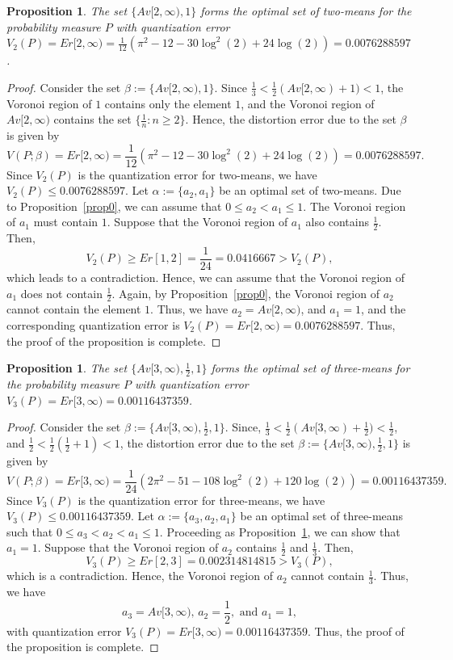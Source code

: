\documentclass[12pt, reqno]{amsart}
\theoremstyle{plain}
\newtheorem{prop}[subsection]{Proposition}
\theoremstyle{definition}
\newcommand{\set}[1]{\{#1\}}%
\newcommand{\ga}{\alpha}
\newcommand{\gb}{\beta}
\newcommand{\te}{\text}%
\begin{document}
\begin{prop} \label{prop01}
The set $\set{Av[2, \infty), 1}$ forms the optimal set of two-means for the probability measure $P$ with quantization error $V_2(P)=Er[2, \infty)=\frac{1}{12} \left(\pi ^2-12-30 \log ^2(2)+24 \log (2)\right)=0.0076288597$.
\end{prop}
\begin{proof}
Consider the set $\gb:=\set{Av[2, \infty), 1}$. Since $\frac 13<\frac 12 (Av[2, \infty)+1)<1$, the Voronoi region of $1$ contains only the element $1$, and the Voronoi region of $Av[2, \infty)$ contains the set $\set{\frac 1 n : n\geq 2}$. Hence, the distortion error due to the set $\gb$ is given by
\[V(P; \gb)=Er[2, \infty)=\frac{1}{12} \left(\pi ^2-12-30 \log ^2(2)+24 \log (2)\right)=0.0076288597.\]
Since $V_2(P)$ is the quantization error for two-means, we have $V_2(P)\leq 0.0076288597$. Let $\ga:=\set{a_2, a_1}$ be an optimal set of two-means. Due to Proposition~\ref{prop0}, we can assume that $0\leq a_2<a_1\leq 1$. The Voronoi region of $a_1$ must contain $1$. Suppose that the Voronoi region of $a_1$ also contains $\frac 12$. Then,
\[V_2(P)\geq Er[1,2]=\frac{1}{24}=0.0416667>V_2(P),\]
which leads to a contradiction. Hence, we can assume that the Voronoi region of $a_1$ does not contain $\frac 12$. Again, by Proposition~\ref{prop0}, the Voronoi region of $a_2$ cannot contain the element $1$. Thus, we have
$a_2=Av[2, \infty)$, and $a_1=1$, and the corresponding quantization error is $V_2(P)=Er[2, \infty)=0.0076288597$. Thus, the proof of the proposition is complete.
\end{proof}

\begin{prop} \label{prop02}
The set $\set{Av[3, \infty), \frac 12, 1}$ forms the optimal set of three-means for the probability measure $P$ with quantization error $V_3(P)=Er[3, \infty)=0.00116437359$.
\end{prop}
\begin{proof}
Consider the set $\gb:=\set{Av[3, \infty), \frac 12, 1}$. Since, $\frac 13 <\frac 12 (Av[3, \infty)+\frac 12)<\frac 12$, and $\frac 12<\frac 12(\frac 12+1)<1$, the distortion error due to the set $\gb:=\set{Av[3, \infty), \frac 12, 1}$ is given by
\[V(P; \gb)=Er[3, \infty)=\frac{1}{24} \left(2 \pi ^2-51-108 \log ^2(2)+120 \log (2)\right)=0.00116437359.\]
Since $V_3(P)$ is the quantization error for three-means, we have $V_3(P)\leq 0.00116437359$. Let $\ga:=\set{a_3, a_2, a_1}$ be an optimal set of three-means such that $0\leq a_3<a_2<a_1\leq 1$. Proceeding as Proposition~\ref{prop01}, we can show that $a_1=1$. Suppose that the Voronoi region of $a_2$  contains $\frac 12$ and $\frac 13$. Then,
  \[V_3(P)\geq Er[2,3]=0.002314814815>V_3(P),\]
which is a contradiction. Hence, the Voronoi region of $a_2$ cannot contain $\frac 13$. Thus, we have
\[a_3=Av[3, \infty), \, a_2=\frac 12, \te{ and } a_1=1,\]
with quantization error $V_3(P)=Er[3, \infty)=0.00116437359$.
Thus, the proof of the proposition is complete.
\end{proof}
\end{document}
